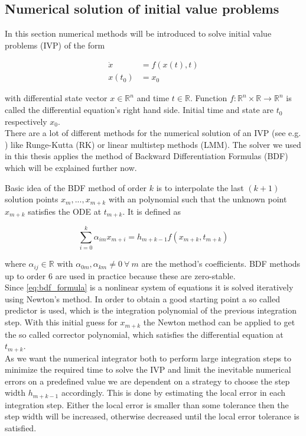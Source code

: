 \documentclass{scrartcl}[12pt, halfparskip]
\numberwithin{equation}{section}
\numberwithin{figure}{section}
\numberwithin{table}{section}
\begin{document}
\subsection{Numerical solution of initial value problems}
\label{sec:theory_ODE_solver_BDF}

In this section numerical methods will be introduced to solve initial value problems (IVP) of the form

\begin{align}
	\dot{x} & = f(x(t),t) \\
	x(t_0) & = x_0 \nonumber
\end{align}

with differential state vector $x \in \mathbb{R}^n$ and time $t \in \mathbb{R}$. Function $f: \mathbb{R}^n \times \mathbb{R} \rightarrow \mathbb{R}^n$ is called the differential equation's right hand side. Initial time and state are $t_0$ respectively $x_0$. \\

There are a lot of different methods for the numerical solution of an IVP (see e.g. \cite{diff_equations_numerics}) like Runge-Kutta (RK) or linear multistep methods (LMM). The solver we used in this thesis applies the method of Backward Differentiation Formulas (BDF) which will be explained further now.

Basic idea of the BDF method of order $k$ is to interpolate the last $(k+1)$ solution points $x_m,...,x_{m+k}$ with an polynomial such that the unknown point $x_{m+k}$ satisfies the ODE at $t_{m+k}$. 
It is defined as

\begin{equation}
	\sum_{i=0}^{k} \alpha_{im} x_{m+i} = h_{m+k-1} f(x_{m+k},t_{m+k})
	\label{eq:bdf_formula}
\end{equation}

where $\alpha_{ij} \in \mathbb{R}$ with $\alpha_{0m},\alpha_{km} \ne 0 \ \forall \ m$ are the method's coefficients. BDF methods up to order 6 are used in practice because these are zero-stable. \\
Since \cref{eq:bdf_formula} is a nonlinear system of equations it is solved iteratively using Newton's method. In order to obtain a good starting point a so called predictor is used, which is the integration polynomial of the previous integration step. With this initial guess for $x_{m+k}$ the Newton method can be applied to get the so called corrector polynomial, which satisfies the differential equation at $t_{m+k}$. \\
As we want the numerical integrator both to perform large integration steps to minimize the required time to solve the IVP and limit the inevitable numerical errors on a predefined value we are dependent on a strategy to choose the step width $h_{m+k-1}$ accordingly. This is done by estimating the local error in each integration step. Either the local error is smaller than some tolerance then the step width will be increased, otherwise decreased until the local error tolerance is satisfied. \\
\end{document}
